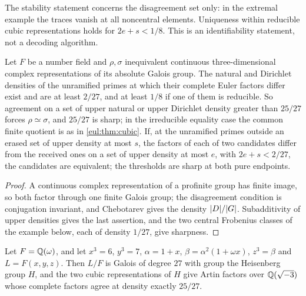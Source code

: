 The stability statement concerns the disagreement set only: in the extremal example the traces vanish at all
noncentral elements. Uniqueness within reducible cubic representations holds for $2e+s<1/8$. This is an
identifiability statement, not a decoding algorithm.

\begin{corollary}\label{eul:cor:artin}
Let $F$ be a number field and $\rho,\sigma$ inequivalent continuous three-dimensional complex representations of its
absolute Galois group. The natural and Dirichlet densities of the unramified primes at which their complete Euler
factors differ exist and are at least $2/27$, and at least $1/8$ if one of them is reducible. So agreement on a set of
upper natural or upper Dirichlet density greater than $25/27$ forces $\rho\simeq\sigma$, and $25/27$ is sharp; in the
irreducible equality case the common finite quotient is as in \cref{eul:thm:cubic}. If, at the unramified primes
outside an erased set of upper density at most $s$, the factors of each of two candidates differ from the received
ones on a set of upper density at most $e$, with $2e+s<2/27$, the candidates are equivalent; the thresholds are sharp
at both pure endpoints.
\end{corollary}

\begin{proof}
A continuous complex representation of a profinite group has finite image, so both factor through one finite Galois
group; the disagreement condition is conjugation invariant, and Chebotarev gives the density $\lvert D\rvert/\lvert G\rvert$.
Subadditivity of upper densities gives the last assertion, and the two central Frobenius classes of the example
below, each of density $1/27$, give sharpness.
\end{proof}

\begin{proposition}\label{eul:prop:field}
Let $F=\mathbb{Q}(\omega)$, and let $x^3=6$, $y^3=7$, $\alpha=1+x$, $\beta=\alpha^2(1+\omega x)$, $z^3=\beta$ and
$L=F(x,y,z)$. Then $L/F$ is Galois of degree $27$ with group the Heisenberg group $H$, and the two cubic
representations of $H$ give Artin factors over $\mathbb{Q}(\sqrt{-3})$ whose complete factors agree at density exactly
$25/27$.
\end{proposition}

